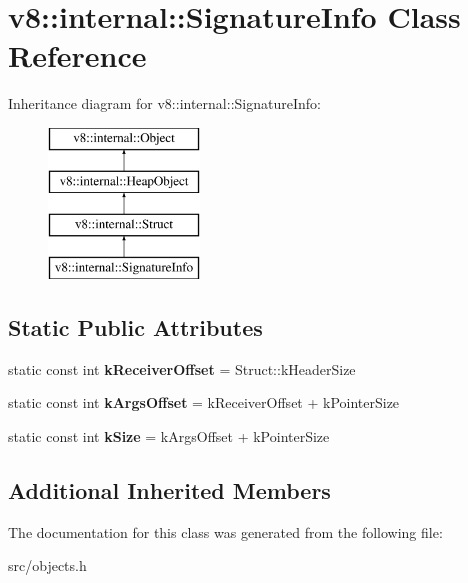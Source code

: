 \hypertarget{classv8_1_1internal_1_1_signature_info}{}\section{v8\+:\+:internal\+:\+:Signature\+Info Class Reference}
\label{classv8_1_1internal_1_1_signature_info}
Inheritance diagram for v8\+:\+:internal\+:\+:Signature\+Info\+:\begin{figure}[H]
\begin{center}
\leavevmode
\includegraphics[height=4.000000cm]{classv8_1_1internal_1_1_signature_info}
\end{center}
\end{figure}
\subsection*{Static Public Attributes}
\begin{DoxyCompactItemize}
\item 
\hypertarget{classv8_1_1internal_1_1_signature_info_a80c425ad0133702f36413c98171b56c0}{}static const int {\bfseries k\+Receiver\+Offset} = Struct\+::k\+Header\+Size\label{classv8_1_1internal_1_1_signature_info_a80c425ad0133702f36413c98171b56c0}

\item 
\hypertarget{classv8_1_1internal_1_1_signature_info_a2f42b380a78f42fa69dc99ab75564db4}{}static const int {\bfseries k\+Args\+Offset} = k\+Receiver\+Offset + k\+Pointer\+Size\label{classv8_1_1internal_1_1_signature_info_a2f42b380a78f42fa69dc99ab75564db4}

\item 
\hypertarget{classv8_1_1internal_1_1_signature_info_abed16cb7dd61f2f4de4e6690a277639e}{}static const int {\bfseries k\+Size} = k\+Args\+Offset + k\+Pointer\+Size\label{classv8_1_1internal_1_1_signature_info_abed16cb7dd61f2f4de4e6690a277639e}

\end{DoxyCompactItemize}
\subsection*{Additional Inherited Members}


The documentation for this class was generated from the following file\+:\begin{DoxyCompactItemize}
\item 
src/objects.\+h\end{DoxyCompactItemize}
